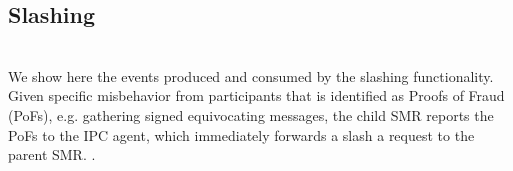 
\subsection{Slashing} 
\\
We show here the events produced and consumed by the slashing functionality. Given specific misbehavior from participants that is identified as Proofs of Fraud (PoFs), e.g.
gathering signed equivocating messages, the child SMR reports the PoFs to the IPC agent, which immediately forwards a slash a request to the parent SMR. .

